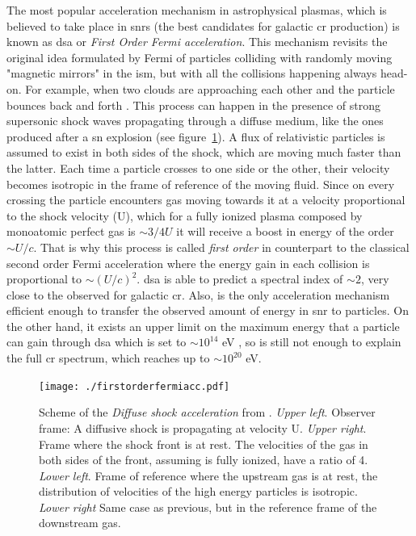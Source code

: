 \documentclass[main.tex]{subfiles}
\begin{document}
The most popular acceleration mechanism in astrophysical plasmas, which is believed to take place in \glspl{snr} (the best candidates for galactic \gls{cr} production) is known as \gls{dsa} or \textit{First Order Fermi acceleration}. This mechanism revisits the original idea formulated by Fermi of particles colliding with randomly moving "magnetic mirrors" in the \gls{ism}, but  with all the collisions happening always head-on. For example, when two clouds are approaching each other and the particle bounces back and forth \cite{2009accelerationmech}. 
This process can happen in the presence of strong supersonic shock waves propagating through a diffuse medium, like the ones produced after a \gls{sn} explosion (see figure~\ref{fig:shock}). 
A flux of relativistic particles is assumed to exist in both sides of the shock, which are moving much faster than the latter. Each time a particle crosses to one side or the other, their velocity becomes isotropic in the frame of reference of the moving fluid. Since on every crossing the particle encounters gas moving towards it at a velocity proportional to the shock velocity (U), which for a fully ionized plasma composed by monoatomic perfect gas is $\sim 3/4 U$ \cite{highenergyastrophy} it will receive a boost in energy of the order $\sim U/c$. That is why this process is called \textit{first order} in counterpart to the classical second order Fermi acceleration where the energy gain in each collision is proportional to $\sim (U/c)^{2}$.  
\gls{dsa} is able to predict a spectral index of $\sim 2$, very close to the observed for galactic \gls{cr}. Also, is the only acceleration mechanism efficient enough to transfer the observed amount of energy in \gls{snr} to particles.
On the other hand, it exists an upper limit on the maximum energy that a particle can gain through \gls{dsa} which is set to $\sim 10^{14}$ eV \cite{1983maximumEinSNR}, so is still not enough to explain the full \gls{cr} spectrum, which reaches up to $\sim 10^{20}$ eV.
\begin{figure}
\centering
 \texttt{[image: ./firstorderfermiacc.pdf]}
  \caption{Scheme of the \textit{Diffuse shock acceleration} from \cite{highenergyastrophy}. \textit{Upper left}. Observer frame: A diffusive shock is propagating at velocity U. \textit{Upper right}. Frame where the shock front is at rest. The velocities of the gas in both sides of the front, assuming is fully ionized, have a ratio of 4. \textit{Lower left}. Frame of reference where the upstream gas is at rest, the distribution of velocities of the high energy particles is isotropic. \textit{Lower right} Same case as previous, but in the reference frame of the downstream gas.}
    \label{fig:shock}
\end{figure}
\end{document}
